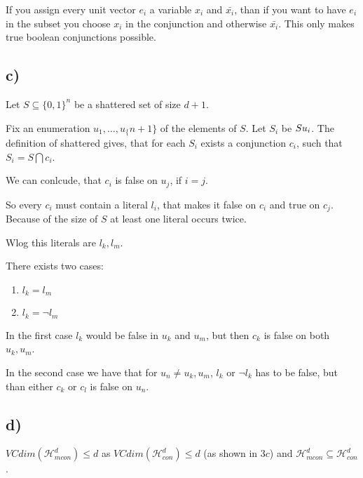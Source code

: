 \documentclass{article}
\begin{document}
If you assign every unit vector $e_i$ a variable $x_i$ and $\bar{x_i}$, than if
you want to have $e_i$ in the subset you choose $x_i$ in the conjunction and
otherwise $\bar{x_i}$. This only makes true boolean conjunctions possible. 

\subsection*{c)}
Let $S\subseteq \{0,1\} ^ n$ be a shattered set of size $d+1$. 

Fix an enumeration $u_1,\ldots,u_\{n+1\}$ of the elements of $S$. Let $S_i$ be
$S\\ u_i$. The definition of shattered gives, that for each $S_i$ exists a
conjunction $c_i$, such that $S_i = S\bigcap c_i$.

We can conlcude, that $c_i$ is false on $u_j$, if $i=j$.

So every $c_i$ must contain a literal $l_i$, that makes it false on $c_i$ and
true on $c_j$. Because of the size of $S$ at least one literal occurs twice.

Wlog this literals are $l_k,l_m$. 

There exists two cases:
\begin{enumerate}
  \item $l_k=l_m$\\
  \item $l_k=\neg l_m$
\end{enumerate}
In the first case $l_k$ would be false in $u_k$ and $u_m$, but then $c_k$ is
false on both $u_k,u_m$.

In the second case we have that for $u_n\neq u_k,u_m$, $l_k \text{ or }\neg l_k$
has to be false, but than either $c_k \text{ or } c_l$ is false on $u_n$.

\subsection*{d)}

$VCdim(\mathcal{H}_{mcon}^d) \leq d$ as $VCdim(\mathcal{H}_{con}^d) \leq d$ (as shown in $3c$) and $\mathcal{H}_{mcon}^d \subseteq \mathcal{H}_{con}^d$. \\
\end{document}
